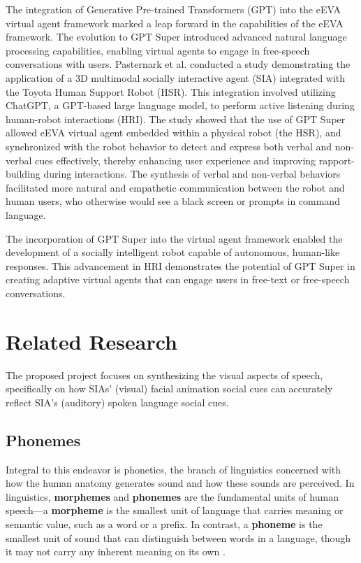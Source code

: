 \documentclass[12pt]{article}
\begin{document}
The integration of Generative Pre-trained Transformers (GPT) into the eEVA virtual agent framework marked a leap forward in the capabilities of the  eEVA framework. The evolution to GPT Super introduced advanced natural language processing capabilities, enabling virtual agents to engage in free-speech conversations with users.  Pasternark et al. \cite{Pasternak20243DListening} conducted a study demonstrating the application of a 3D multimodal socially interactive agent (SIA) integrated with the Toyota Human Support Robot (HSR). This integration involved utilizing ChatGPT, a GPT-based large language model, to perform active listening during human-robot interactions (HRI). The study showed that the use of GPT Super allowed eEVA virtual agent embedded within a physical robot (the HSR), and synchronized with the robot behavior to detect and express both verbal and non-verbal cues effectively, thereby enhancing user experience and improving rapport-building during interactions. The synthesis of verbal and non-verbal behaviors facilitated more natural and empathetic communication between the robot and human users, who otherwise would see a black screen or prompts in command language.

The incorporation of GPT Super into the virtual agent framework enabled the development of a socially intelligent robot capable of autonomous, human-like responses. This advancement in HRI demonstrates the potential of GPT Super in creating adaptive virtual agents that can engage users in free-text or free-speech conversations.  

\section{Related Research}
\label{sec:relatedResearch}

 The proposed project focuses on synthesizing the visual aspects of speech, specifically on how SIAs' (visual) facial animation social cues can accurately reflect SIA's (auditory) spoken language social cues. 
 
 \subsection{Phonemes} 
 \label{sec:phonemes}
 Integral to this endeavor is phonetics, the branch of linguistics concerned with how the human anatomy generates sound and how these sounds are perceived. In linguistics, \textbf{morphemes} and \textbf{phonemes} are the fundamental units of human speech—a \textbf{morpheme} is the smallest unit of language that carries meaning or semantic value, such as a word or a prefix. In contrast, a \textbf{phoneme} is the smallest unit of sound that can distinguish between words in a language, though it may not carry any inherent meaning on its own \cite{Payack2008AWorld}.
\end{document}
